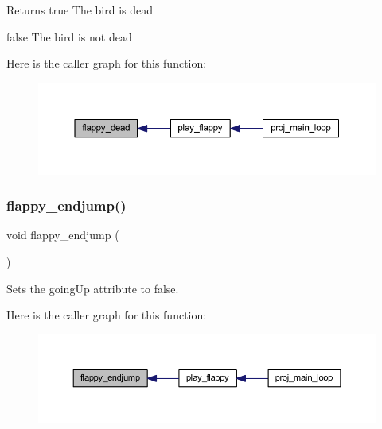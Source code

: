 \begin{DoxyReturn}{Returns}
true The bird is dead 

false The bird is not dead 
\end{DoxyReturn}
Here is the caller graph for this function\+:\nopagebreak
\begin{figure}[H]
\begin{center}
\leavevmode
\includegraphics[width=350pt]{group__flappy_ga0f81030140c19deb72d5f033591450a8_icgraph}
\end{center}
\end{figure}
\mbox{\label{group__flappy_ga321a721b58061dddbdae841607210cf0}} 
\subsubsection{\texorpdfstring{flappy\+\_\+endjump()}{flappy\_endjump()}}
{\footnotesize\ttfamily void flappy\+\_\+endjump (\begin{DoxyParamCaption}{ }\end{DoxyParamCaption})}



Sets the going\+Up attribute to false. 

Here is the caller graph for this function\+:\nopagebreak
\begin{figure}[H]
\begin{center}
\leavevmode
\includegraphics[width=350pt]{group__flappy_ga321a721b58061dddbdae841607210cf0_icgraph}
\end{center}
\end{figure}
\mbox{\label{group__flappy_gab4a401acb5fffbf99413000dcdff3486}} 

